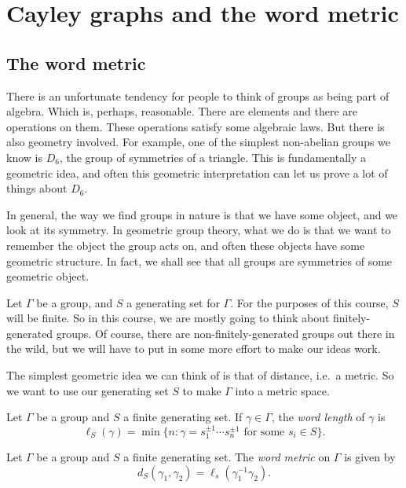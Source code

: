 \documentclass[a4paper]{article}
\begin{document}
\tableofcontents

\section{Cayley graphs and the word metric}
\subsection{The word metric}
There is an unfortunate tendency for people to think of groups as being part of algebra. Which is, perhaps, reasonable. There are elements and there are operations on them. These operations satisfy some algebraic laws. But there is also geometry involved. For example, one of the simplest non-abelian groups we know is $D_6$, the group of symmetries of a triangle. This is fundamentally a geometric idea, and often this geometric interpretation can let us prove a lot of things about $D_6$.

In general, the way we find groups in nature is that we have some object, and we look at its symmetry. In geometric group theory, what we do is that we want to remember the object the group acts on, and often these objects have some geometric structure. In fact, we shall see that all groups are symmetries of some geometric object.

Let $\Gamma$ be a group, and $S$ a generating set for $\Gamma$. For the purposes of this course, $S$ will be finite. So in this course, we are mostly going to think about finitely-generated groups. Of course, there are non-finitely-generated groups out there in the wild, but we will have to put in some more effort to make our ideas work.

The simplest geometric idea we can think of is that of distance, i.e.\ a metric. So we want to use our generating set $S$ to make $\Gamma$ into a metric space.

\begin{defi}
  Let $\Gamma$ be a group and $S$ a finite generating set. If $\gamma \in \Gamma$, the \emph{word length} of $\gamma$ is
  \[
    \ell_S(\gamma) = \min \{n : \gamma = s_1^{\pm 1} \cdots s_n^{\pm 1}\text{ for some } s_i \in S\}.
  \]
\end{defi}

\begin{defi}
  Let $\Gamma$ be a group and $S$ a finite generating set. The \emph{word metric} on $\Gamma$ is given by
  \[
    d_S (\gamma_1, \gamma_2) = \ell_s(\gamma_1^{-1} \gamma_2).
  \]
\end{defi}
\end{document}
